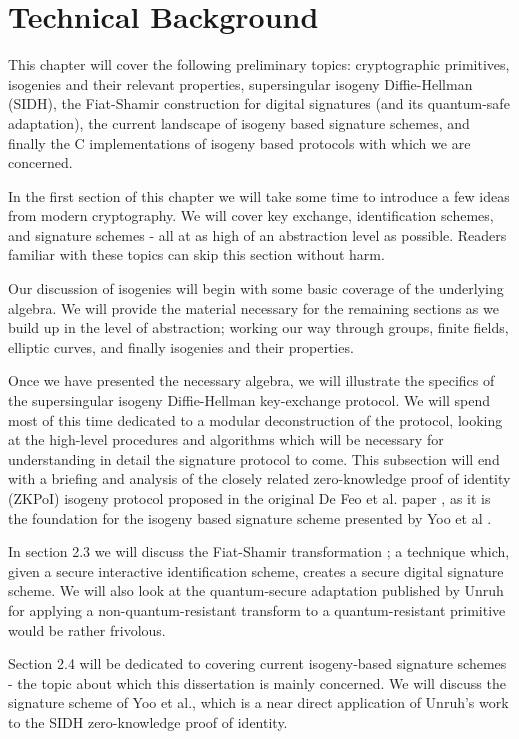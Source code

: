 \chapter{Technical Background}

This chapter will cover the following preliminary topics: cryptographic primitives, isogenies and their relevant properties, supersingular isogeny Diffie-Hellman (SIDH), the Fiat-Shamir construction for digital signatures (and its quantum-safe adaptation), the current landscape of isogeny based signature schemes, and finally the C implementations of isogeny based protocols with which we are concerned.

In the first section of this chapter we will take some time to introduce a few ideas from modern cryptography. We will cover key exchange, identification schemes, and signature schemes - all at as high of an abstraction level as possible. Readers familiar with these topics can skip this section without harm. 

Our discussion of isogenies will begin with some basic coverage of the underlying algebra. We will provide the material necessary for the remaining sections as we build up in the level of abstraction; working our way through groups, finite fields, elliptic curves, and finally isogenies and their properties.

Once we have presented the necessary algebra, we will illustrate the specifics of the supersingular isogeny Diffie-Hellman key-exchange protocol. We will spend most of this time dedicated to a modular deconstruction of the protocol, looking at the high-level procedures and algorithms which will be necessary for understanding in detail the signature protocol to come. This subsection will end with a briefing and analysis of the closely related zero-knowledge proof of identity (ZKPoI) isogeny protocol proposed in the original De Feo et al. paper \cite{djp}, as it is the foundation for the isogeny based signature scheme presented by Yoo et al \cite{yoo}.

In section 2.3 we will discuss the Fiat-Shamir transformation \cite{sigs}; a technique which, given a secure interactive identification scheme, creates a secure digital signature scheme. We will also look at the quantum-secure adaptation published by Unruh \cite{unruh} for applying a non-quantum-resistant transform to a quantum-resistant primitive would be rather frivolous.

Section 2.4 will be dedicated to covering current isogeny-based signature schemes - the topic about which this dissertation is mainly concerned. We will discuss the signature scheme of Yoo et al., which is a near direct application of Unruh's work to the SIDH zero-knowledge proof of identity.

